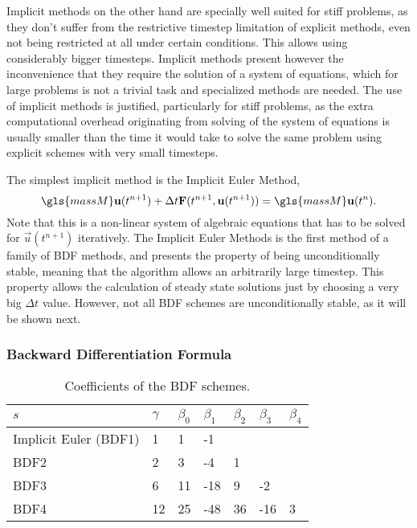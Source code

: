 Implicit methods  on the other hand are specially well suited for stiff problems, as they don't suffer from the restrictive timestep limitation of explicit methods, even not being restricted at all under certain conditions. This allows using considerably bigger timesteps. Implicit methods present however the inconvenience that they require the solution of a system of equations, which for large problems is not a trivial task and specialized methods are needed. The use of implicit methods is justified, particularly for stiff problems, as the extra computational overhead originating from solving of the system of equations is usually smaller than the time it would take to solve the same problem using explicit schemes with very small timesteps.

The simplest implicit method is the Implicit Euler Method,
\begin{equation}
\gls{massM}\vec{u}(t^{n+1}) + \Delta t\vec{F}(t^{n+1},\vec{u}(t^{n+1}))= \gls{massM}\vec{u}(t^{n}).
\end{equation}
Note that this is a non-linear system of algebraic equations that has to be solved for $\vec{u}(t^{n+1})$ iteratively. The Implicit Euler Methods is the first method of a family of \gls{BDF} methods, and presents the property of being unconditionally stable, meaning that the algorithm allows an arbitrarily large timestep. This property allows the calculation of steady state solutions just by choosing a very big $\Delta t$ value. However, not all BDF schemes are unconditionally stable, as it will be shown next.
\subsubsection{Backward Differentiation Formula}
\begin{table}[h]
	\centering
	\begin{tabular}{lllllll}
		\hline
		$s$                   & $\gamma$ & $\beta_0$ & $\beta_1$ & $\beta_2$ & $\beta_3$ & $\beta_4$ \\ \hline
		Implicit Euler (BDF1) & 1        & 1         & -1        &           &           &           \\
		BDF2                  & 2        & 3         & -4        & 1         &           &           \\
		BDF3                  & 6        & 11        & -18       & 9         & -2        &           \\
		BDF4                  & 12       & 25        & -48       & 36        & -16       & 3         \\ \hline
	\end{tabular}
	\caption{Coefficients of the BDF schemes.}
	\label{tab:BDFCoeff}
\end{table}

